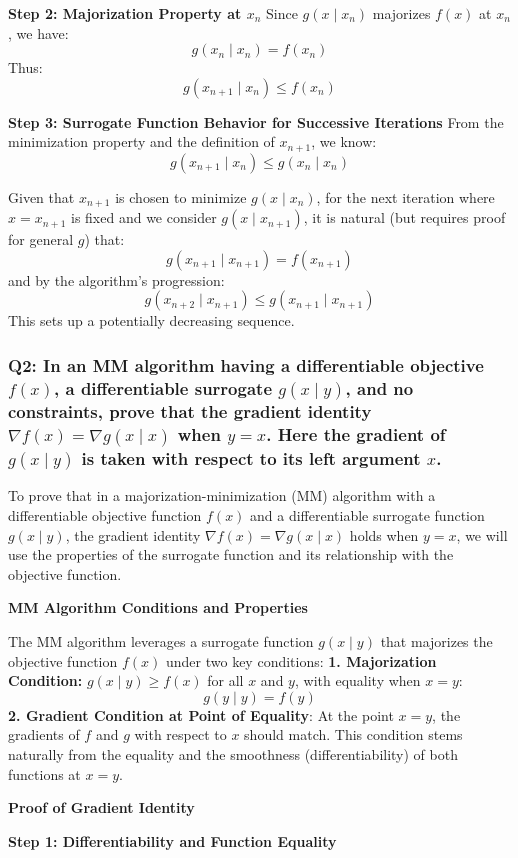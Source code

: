 \documentclass[8pt]{article}
\begin{document}
{\textbf{Step 2: Majorization Property at \(x_n\)}
Since \(g(x \mid x_n)\) majorizes \(f(x)\) at \(x_n\), we have:
\[
g(x_n \mid x_n) = f(x_n)
\]
Thus:
\[
g(x_{n+1} \mid x_n) \leq f(x_n)
\]

\textbf{Step 3: Surrogate Function Behavior for Successive Iterations}
From the minimization property and the definition of \(x_{n+1}\), we know:
\[
g(x_{n+1} \mid x_n) \leq g(x_n \mid x_n)
\]

Given that \(x_{n+1}\) is chosen to minimize \(g(x \mid x_n)\), for the next iteration where \(x = x_{n+1}\) is fixed and we consider \(g(x \mid x_{n+1})\), it is natural (but requires proof for general \(g\)) that:
\[
g(x_{n+1} \mid x_{n+1}) = f(x_{n+1})
\]
and by the algorithm’s progression:
\[
g(x_{n+2} \mid x_{n+1}) \leq g(x_{n+1} \mid x_{n+1})
\]
This sets up a potentially decreasing sequence.

\subsubsection*{Q2: In an MM algorithm having a differentiable objective \(f(x)\), a differentiable surrogate \(g(x \mid y)\), and no constraints, prove that the gradient identity \(\nabla f(x) = \nabla g(x \mid x)\) when \(y = x\). Here the gradient of \(g(x \mid y)\) is taken with respect to its left argument \(x\).}

To prove that in a majorization-minimization (MM) algorithm with a differentiable objective function \(f(x)\) and a differentiable surrogate function \(g(x \mid y)\), the gradient identity \(\nabla f(x) = \nabla g(x \mid x)\) holds when \(y = x\), we will use the properties of the surrogate function and its relationship with the objective function.

\textbf{MM Algorithm Conditions and Properties}

The MM algorithm leverages a surrogate function \(g(x \mid y)\) that majorizes the objective function \(f(x)\) under two key conditions:
\textbf{1. Majorization Condition:} \(g(x \mid y) \geq f(x)\) for all \(x\) and \(y\), with equality when \(x = y\):
   \[
   g(y \mid y) = f(y)
   \]
\textbf{2. Gradient Condition at Point of Equality}: At the point \(x = y\), the gradients of \(f\) and \(g\) with respect to \(x\) should match. This condition stems naturally from the equality and the smoothness (differentiability) of both functions at \(x = y\).

\textbf{Proof of Gradient Identity}

\textbf{Step 1: Differentiability and Function Equality}

}
\end{document}
